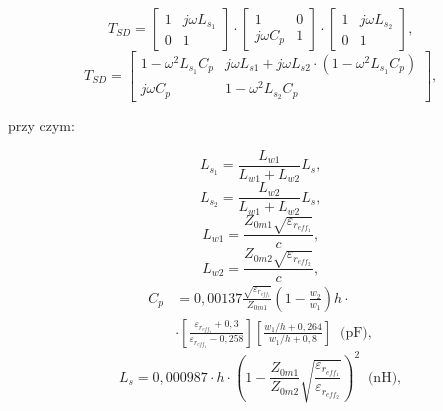  \begin{equation}
    \label{step_discontinuity_matrix_eq}
      T_{SD} = \begin{bmatrix} 1 & j\omega L_{s_1} \\ 0 & 1 \end{bmatrix} \cdot \begin{bmatrix} 1 & 0 \\ j\omega C_p & 1 \end{bmatrix}
      \cdot \begin{bmatrix} 1 & j\omega L_{s_2} \\ 0 & 1 \end{bmatrix} \text{,}
 \end{equation}
\begin{equation}
    \label{step_discontinuity_matrix_2_eq}
      T_{SD} =  \begin{bmatrix}
      1 - \omega^2 L_{s_1}C_{p} &j\omega L_{s1} + j\omega L_{s2} \cdot \left( 1 - \omega^{2} L_{s_1} C_{p} \right) \\ 
      j\omega C_p & 1 - \omega^2 L_{s_2} C_{p} \end{bmatrix} \text{,}
 \end{equation}

\noindent przy czym:

 \begin{equation}
    \label{step_discontinuity_3_eq}
      L_{s_1}=\frac{L_{w1}}{L_{w1}+L_{w2}}L_s \text{,}
 \end{equation}
\begin{equation}
    \label{step_discontinuity_4_eq}
      L_{s_2}=\frac{L_{w2}}{L_{w1}+L_{w2}}L_s \text{,}
 \end{equation}
   \begin{equation}
    \label{step_discontinuity_eq}
      L_{w1}=\frac{Z_{0m1}\sqrt{\varepsilon_{r_{eff_1}}}}{c}\text{,}
 \end{equation}
\begin{equation}
    \label{step_discontinuity_2_eq}
      L_{w2}=\frac{Z_{0m2}\sqrt{\varepsilon_{r_{eff_2}}}}{c} \text{,}
 \end{equation}
\begin{equation}
    \begin{split}
    \label{step_discontinuity_5_eq}
      C_p &  =0,00137\frac{\sqrt{\varepsilon_{r_{eff_1}}}}{Z_{0m1}}\left(1-\frac{w_2}{w_1}\right)  h \cdot \\ & \cdot \left[\frac{\varepsilon_{r_{eff_1}}+0,3}{\varepsilon_{r_{eff_1}}-0,258}\right] \left[\frac{{w_1/h}+0,264}{{w_1}/{h}+0,8}\right] \;\; \text{(pF),}
      \end{split}
 \end{equation}
\begin{equation}
    \label{step_discontinuity_6_eq}
      L_s=0,000987 \cdot h \cdot \left(1-\frac{Z_{0m1}}{Z_{0m2}}\sqrt{\frac{\varepsilon_{r_{eff_1}}}{\varepsilon_{r_{eff_2}}}}\right)^2 \;\; \text{(nH),} 
 \end{equation}

